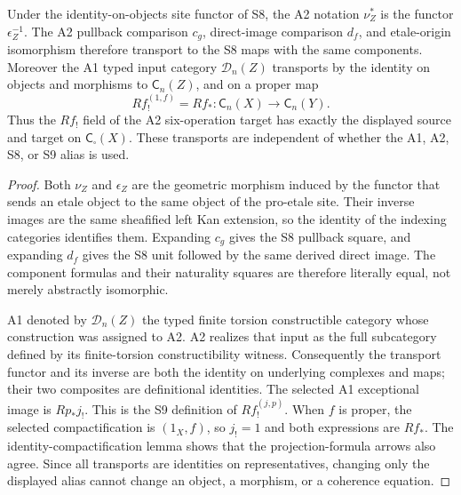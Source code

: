 \begin{lemma}
\label{lemma:weil-pbc-a2-comparison-rfshriek-transport}
Under the identity-on-objects site functor of S8, the A2 notation
$\nu_Z^*$ is the functor $\epsilon_Z^{-1}$.  The A2 pullback comparison
$c_g$, direct-image comparison $d_f$, and etale-origin isomorphism therefore
transport to the S8 maps with the same components.  Moreover the A1 typed
input category $\mathcal D_n(Z)$ transports by the identity on objects and
morphisms to $\mathsf C_n(Z)$, and on a proper map
\[
 Rf_!^{(1,f)}=Rf_*:\mathsf C_n(X)\longrightarrow\mathsf C_n(Y).
\]
Thus the $Rf_!$ field of the A2 six-operation target has exactly the displayed
source and target on $\mathsf C_\square(X)$.  These transports are independent
of whether the A1, A2, S8, or S9 alias is used.
\end{lemma}
\begin{proof}

Both $\nu_Z$ and $\epsilon_Z$ are the geometric morphism induced by the
functor that sends an etale object to the same object of the pro-etale site.
Their inverse images are the same sheafified left Kan extension, so the
identity of the indexing categories identifies them.  Expanding $c_g$ gives
the S8 pullback square, and expanding $d_f$ gives the S8 unit followed by the
same derived direct image.  The component formulas and their naturality
squares are therefore literally equal, not merely abstractly isomorphic.

A1 denoted by $\mathcal D_n(Z)$ the typed finite torsion constructible
category whose construction was assigned to A2.  A2 realizes that input as
the full subcategory defined by its finite-torsion constructibility witness.
Consequently the transport functor and its inverse are both the identity on
underlying complexes and maps; their two composites are definitional
identities.  The selected A1 exceptional image is $Rp_*j_!$.  This is the S9
definition of $Rf_!^{(j,p)}$.  When $f$ is proper, the selected
compactification is $(1_X,f)$, so $j_!=1$ and both expressions are $Rf_*$.
The identity-compactification lemma shows that the projection-formula arrows
also agree.  Since all transports are identities on representatives, changing
only the displayed alias cannot change an object, a morphism, or a coherence
equation.
\end{proof}

